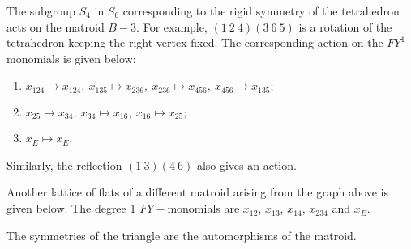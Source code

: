\documentclass[12pt]{article}
\begin{document}
The subgroup $S_4$ in $S_6$ corresponding to the rigid symmetry
of the tetrahedron acts on the matroid $B-3$. For example,
$(1\ 2\ 4)(3\ 6\ 5)$ is a rotation of the tetrahedron keeping
the right vertex fixed. The corresponding action on the
$FY^1$ monomials is given below:
\begin{enumerate}
    \item $x_{124}\mapsto x_{124},\ x_{135}\mapsto x_{236},\
    x_{236}\mapsto x_{456},\ x_{456}\mapsto x_{135};$
    \item $x_{25}\mapsto x_{34},\ x_{34}\mapsto x_{16},\
    x_{16}\mapsto x_{25};$
    \item $x_E\mapsto x_E$.
\end{enumerate}
Similarly, the reflection $(1\ 3)(4\ 6)$ also gives an action.

\vspace*{3mm}
\adjustbox{center}{
    \begin{tikzcd}
        && \bullet && \bullet \\
        \\
        \bullet &&&& \bullet
        \arrow["2"', no head, from=1-3, to=3-1]
        \arrow["3"', no head, from=3-1, to=3-5]
        \arrow["4"', no head, from=1-3, to=3-5]
        \arrow["1"', no head, from=1-3, to=1-5]
    \end{tikzcd}
}
Another lattice of flats of a different matroid arising from
the graph above
is given below. The degree 1 $FY-$monomials are $x_{12}$,
$x_{13}$, $x_{14}$, $x_{234}$ and $x_E$.\\


The symmetries of the triangle are the automorphisms of the
matroid.
\end{document}
